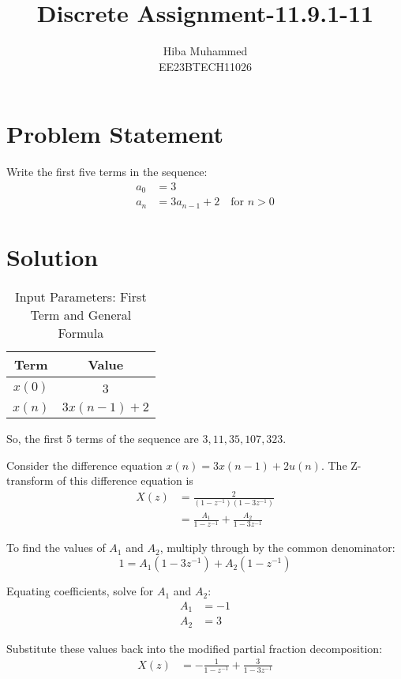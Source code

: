 \documentclass[12pt]{article}
\title{Discrete Assignment-11.9.1-11}
\author{Hiba Muhammed \\
        EE23BTECH11026}
\date{}
\begin{document}
\maketitle

\section*{Problem Statement}
Write the first five terms in the sequence:
\begin{align}
a_{0}  &= 3 \\
a_{n}  &= 3a_{n-1} + 2 \quad \text{for } n > 0
\end{align}

\section*{Solution}
\begin{table}[h]
  \centering
  \caption{Input Parameters: First Term and General Formula}
  \begin{tabular}{|c|c|}
    \hline
    \textbf{Term} & \textbf{Value} \\
    \hline
    \(x(0)\) & 3 \\
    \(x(n)\) & \(3x(n-1) + 2\) \\
    \hline
  \end{tabular}
\end{table}


So, the first 5 terms of the sequence are \(3, 11, 35, 107, 323\).

Consider the difference equation \(x(n) = 3x(n-1) + 2u(n)\). The Z-transform of this difference equation is
\begin{align}
X(z) &= \frac{2}{(1 - z^{-1})(1 - 3z^{-1})} \\
&= \frac{A_1}{1 - z^{-1}} + \frac{A_2}{1 - 3z^{-1}}
\end{align}

To find the values of \(A_1\) and \(A_2\), multiply through by the common denominator:
\begin{equation}
1 = A_1(1-3z^{-1}) + A_2(1-z^{-1})
\end{equation}

Equating coefficients, solve for \(A_1\) and \(A_2\):
\begin{align}
A_1 &= -1 \\
A_2 &= 3
\end{align}

Substitute these values back into the modified partial fraction decomposition:
\begin{align*}
X(z) &= -\frac{1}{1-z^{-1}} + \frac{3}{1-3z^{-1}} \\
\end{align*}
\end{document}
